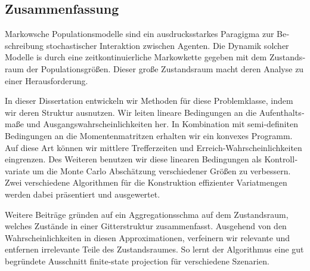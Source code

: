 \begin{otherlanguage}{ngerman}
\chapter*{Zusammenfassung}
Markowsche Populationsmodelle sind ein ausdrucksstarkes Paragigma zur Beschreibung stochastischer Interaktion zwischen Agenten.
Die Dynamik solcher Modelle is durch eine zeitkontinuierliche Markowkette gegeben mit dem Zustandsraum der Populationsgrößen.
Dieser große Zustandsraum macht deren Analyse zu einer Herausforderung.

In dieser Dissertation entwickeln wir Methoden für diese Problemklasse, indem wir deren Struktur ausnutzen.
Wir leiten lineare Bedingungen an die Aufenthaltsmaße und Ausgangswahrscheinlichkeiten her.
In Kombination mit semi-definiten Bedingungen an die Momentenmatritzen erhalten wir ein konvexes Programm.
Auf diese Art können wir mittlere Trefferzeiten und Erreich-Wahrscheinlichkeiten eingrenzen.
Des Weiteren benutzen wir diese linearen Bedingungen als Kontrollvariate um die Monte Carlo Abschätzung verschiedener Größen zu verbessern.
Zwei verschiedene Algorithmen für die Konstruktion effizienter Variatmengen werden dabei präsentiert und ausgewertet.

Weitere Beiträge gründen auf ein Aggregationsschma auf dem Zustandsraum, welches Zustände in einer Gitterstruktur zusammenfasst.
Ausgehend von den Wahrscheinlichkeiten in diesen Approximationen, verfeinern wir relevante und entfernen irrelevante Teile des Zustandsraumes.
    So lernt der Algorithmus eine gut begründete Ausschnitt \glqq finite-state projection\grqq{} für verschiedene Szenarien.
\end{otherlanguage}


\vfill
